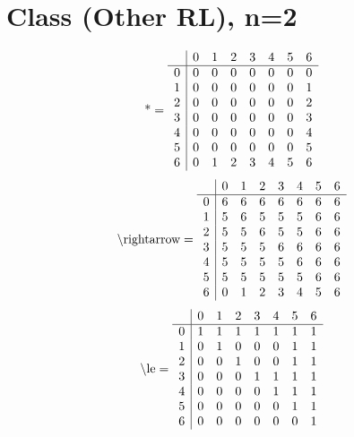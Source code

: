 \documentclass[11pt]{article}
\begin{document}
\section{Class (Other RL), n=2}
\[\text{*} = 
\begin{array}{r | r r r r r r r}
 & 0 & 1 & 2 & 3 & 4 & 5 & 6 \\ \hline
0 & 0 & 0 & 0 & 0 & 0 & 0 & 0 \\
1 & 0 & 0 & 0 & 0 & 0 & 0 & 1 \\
2 & 0 & 0 & 0 & 0 & 0 & 0 & 2 \\
3 & 0 & 0 & 0 & 0 & 0 & 0 & 3 \\
4 & 0 & 0 & 0 & 0 & 0 & 0 & 4 \\
5 & 0 & 0 & 0 & 0 & 0 & 0 & 5 \\
6 & 0 & 1 & 2 & 3 & 4 & 5 & 6 \\
\end{array}
\]
\[\text{\textbackslash rightarrow} = 
\begin{array}{r | r r r r r r r}
 & 0 & 1 & 2 & 3 & 4 & 5 & 6 \\ \hline
0 & 6 & 6 & 6 & 6 & 6 & 6 & 6 \\
1 & 5 & 6 & 5 & 5 & 5 & 6 & 6 \\
2 & 5 & 5 & 6 & 5 & 5 & 6 & 6 \\
3 & 5 & 5 & 5 & 6 & 6 & 6 & 6 \\
4 & 5 & 5 & 5 & 5 & 6 & 6 & 6 \\
5 & 5 & 5 & 5 & 5 & 5 & 6 & 6 \\
6 & 0 & 1 & 2 & 3 & 4 & 5 & 6 \\
\end{array}
\]
\[\text{\textbackslash le} = 
\begin{array}{r | r r r r r r r}
 & 0 & 1 & 2 & 3 & 4 & 5 & 6 \\ \hline
0 & 1 & 1 & 1 & 1 & 1 & 1 & 1 \\
1 & 0 & 1 & 0 & 0 & 0 & 1 & 1 \\
2 & 0 & 0 & 1 & 0 & 0 & 1 & 1 \\
3 & 0 & 0 & 0 & 1 & 1 & 1 & 1 \\
4 & 0 & 0 & 0 & 0 & 1 & 1 & 1 \\
5 & 0 & 0 & 0 & 0 & 0 & 1 & 1 \\
6 & 0 & 0 & 0 & 0 & 0 & 0 & 1 \\
\end{array}
\]
\end{document}
